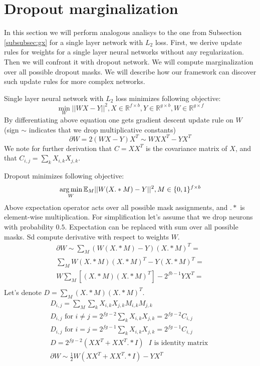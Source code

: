 \section{Dropout marginalization}\label{sec:dropout}
In this section we will perform analogous analisys to the one from Subsection \ref{subsubsec:gx} 
for a single layer network with $L_2$ loss. 
First, we derive update rules for weights for a single layer neural networks without any regularization. Then
we will confront it with dropout network. We will compute marginalization over
all possible dropout masks.
We will describe how our framework can discover
such update rules for more complex networks.

Single layer neural network with $L_2$ loss minimizes following objective:
\begin{equation*}
  \min_W ||WX - Y||^2, X \in \mathbb{R}^{f \times b}, Y \in \mathbb{R}^{g \times b}, W \in \mathbb{R}^{g \times f}
\end{equation*}
By differentiating above equation one gets gradient descent update rule
on $W$ (sign $\sim$ indicates that we drop multiplicative constants)
\begin{equation*}
 \partial W = 2(WX - Y)X^T \sim WXX^T - YX^T
\end{equation*}
We note for further derivation that $C = XX^T$ is the covariance matrix of
$X$, and that $C_{i,j} = \sum_k X_{i, k}X_{j, k}$.


Dropout minimizes following objective:
\begin{equation*}
  \operatorname*{arg\,min}_W \mathbb{E}_M ||W(X .* M) - Y||^2, M \in \{0, 1\}^{f \times b}
\end{equation*}
Above expectation operator acts over all possible mask assignments, and $.*$ is 
element-wise multiplication. For simplification
let's assume that we drop neurons with probability $0.5$. Expectation
can be replaced with sum over all possible masks. Sd compute
derivative with respect to weights $W$. 
\begin{align*}
  \partial W \sim \sum_M (W(X .* M) - Y)(X .* M)^T = \\
  \sum_M W(X .* M)(X .* M)^T - Y(X .* M)^T = \\
  W\sum_M [(X .* M)(X .* M)^T] - 2^{fb - 1}YX^T= \\
\end{align*}
Let's denote $D = \sum_M (X .* M)(X .* M)^T$. 
\begin{align*}
  D_{i,j} = \sum_M \sum_k X_{i, k} X_{j, k} M_{i, k} M_{j, k} \\
  D_{i,j} \text{ for } i \neq j = 2^{fg - 2} \sum_k X_{i, k} X_{j, k} = 2^{fg - 2}C_{i, j} \\
  D_{i,j} \text{ for } i = j = 2^{fg - 1} \sum_k X_{i, k} X_{j, k} = 2^{fg - 1}C_{i, j} \\
  D = 2^{fg - 2}(XX^T + XX^T .* I) \text { $I$ is identity matrix } \\
  \partial W \sim \frac{1}{2}W (XX^T + XX^T .* I) - YX^T
\end{align*}

